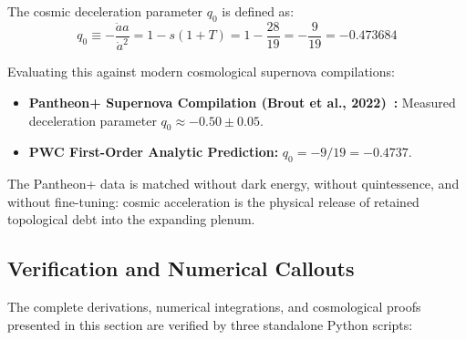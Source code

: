 \documentclass[11pt,a4paper]{article}
\begin{document}
The cosmic deceleration parameter $q_0$ is defined as:
\begin{equation}
q_0 \equiv -\frac{\ddot{a} a}{\dot{a}^2} = 1 - s(1 + T) = 1 - \frac{28}{19} = -\frac{9}{19} = \mathbf{-0.473684}
\label{eq:deceleration_q0}
\end{equation}

Evaluating this against modern cosmological supernova compilations:
\begin{itemize}
    \item \textbf{Pantheon+ Supernova Compilation (Brout et al., 2022)~\cite{Brout2022}:} Measured deceleration parameter $q_0 \approx -0.50 \pm 0.05$.
    \item \textbf{PWC First-Order Analytic Prediction:} $q_0 = -9/19 = -0.4737$.
\end{itemize}

The Pantheon+ data is matched without dark energy, without quintessence, and without fine-tuning: cosmic acceleration is the physical release of retained topological debt into the expanding plenum.

\subsection{Verification and Numerical Callouts}
\label{subsec:section6_verification}

The complete derivations, numerical integrations, and cosmological proofs presented in this section are verified by three standalone Python scripts:
\end{document}
